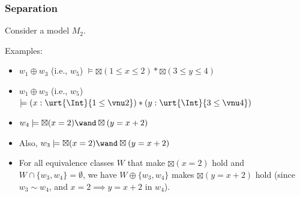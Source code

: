 \begin{frame}[fragile]
    \frametitle{Separation}

Consider a model $M_2$.


Examples:
\begin{itemize}
    \item $w_1 \oplus w_3$ (i.e., $w_5$) $\models \boxtimes (1 \leq x \leq 2) * \boxtimes (3 \leq y \leq 4)$
    \item $w_1 \oplus w_3$ (i.e., $w_5$) $\models (x : \urt{\Int}{1 \leq \vnu 2}) * (y : \urt{\Int}{3 \leq \vnu 4})$
    \item $w_4 \models \boxtimes (x = 2) \wand \boxtimes (y = x + 2)$
    \item Also, $w_3 \models \boxtimes (x = 2) \wand \boxtimes (y = x + 2)$
    \item For all equivalence classes $W$ that make $\boxtimes(x = 2)$ hold and $W \cap \{w_3, w_4\} = \emptyset$, we have $W \oplus \{w_3, w_4\}$ makes $\boxtimes (y = x + 2)$ hold (since $w_3 \sim w_4$, and $x = 2 \implies y = x + 2$ in $w_4$). 
\end{itemize}

\end{frame}

